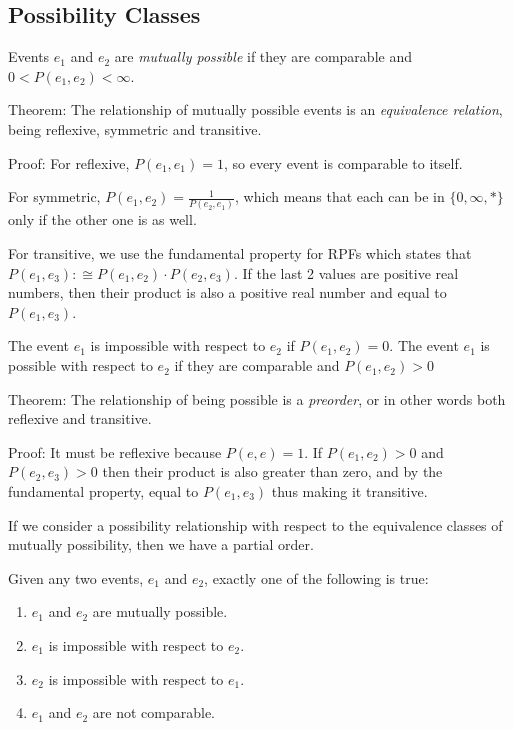 \documentclass[twoside]{article}
\begin{document}
\subsection{Possibility Classes}

Events \(e_1\) and \(e_2\) are \textit{mutually possible} if they are comparable and \(0 < P(e_1, e_2) < \infty\).

Theorem: The relationship of mutually possible events is an \textit{equivalence relation}, being reflexive, symmetric and transitive.

Proof: For reflexive, \(P(e_1, e_1) = 1\), so every event is comparable to itself.

For symmetric, \(P(e_1, e_2) = \frac{1}{P(e_2, e_1)}\), which means that each can be in \(\{0, \infty, \ast\}\) only if the other one is as well.

For transitive, we use the fundamental property for RPFs which states that \(P(e_1, e_3) :\cong P(e_1, e_2) \cdot P(e_2, e_3)\). If the last 2 values are positive real numbers, then their product is also a positive real number and equal to \(P(e_1, e_3)\).

The event \(e_1\) is impossible with respect to \(e_2\) if \(P(e_1, e_2) = 0\). The event \(e_1\) is possible with respect to \(e_2\) if they are comparable and \(P(e_1, e_2) > 0\)

Theorem: The relationship of being possible is a \textit{preorder}, or in other words both reflexive and transitive.

Proof: It must be reflexive because \(P(e, e) = 1\). If \(P(e_1, e_2) > 0\) and \(P(e_2, e_3) > 0\) then their product is also greater than zero, and by the fundamental property, equal to \(P(e_1, e_3)\) thus making it transitive.

If we consider a possibility relationship with respect to the equivalence classes of mutually possibility, then we have a partial order.

Given any two events, \(e_1\) and \(e_2\), exactly one of the following is true:
\begin{enumerate}
  \item \(e_1\) and \(e_2\) are mutually possible.
  \item \(e_1\) is impossible with respect to \(e_2\).
  \item \(e_2\) is impossible with respect to \(e_1\).
  \item \(e_1\) and \(e_2\) are not comparable.
\end{enumerate}
\end{document}
